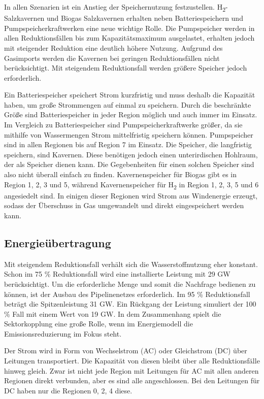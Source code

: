 In allen Szenarien ist ein Anstieg der Speichernutzung festzustellen. H\textsubscript{2}-Salzkavernen und Biogas Salzkavernen erhalten neben Batteriespeichern und Pumpspeicherkraftwerken eine neue wichtige Rolle. Die Pumpspeicher werden in allen Reduktionsfällen bis zum Kapazitätsmaximum ausgelastet, erhalten jedoch mit steigender Reduktion eine deutlich höhere Nutzung. 
Aufgrund des Gasimports werden die Kavernen bei geringen Reduktionsfällen nicht berücksichtigt. Mit steigendem Reduktionsfall werden größere Speicher jedoch erforderlich.


Ein Batteriespeicher speichert Strom kurzfristig und muss deshalb die Kapazität haben, um große Strommengen auf einmal zu speichern. Durch die beschränkte Größe sind Batteriespeicher in jeder Region möglich und auch immer im Einsatz.
Im Vergleich zu Batteriespeicher sind Pumpspeicherkraftwerke größer, da sie mithilfe von Wassermengen Strom mittelfristig speichern können. Pumpspeicher sind in allen Regionen bis auf Region 7 im Einsatz.
Die Speicher, die langfristig speichern, sind Kavernen. Diese benötigen jedoch einen unterirdischen Hohlraum, der als Speicher dienen kann. Die Gegebenheiten für einen solchen Speicher sind also nicht überall einfach zu finden. Kavernenspeicher für Biogas gibt es in Region 1, 2, 3 und 5, während Kavernenspeicher für H\textsubscript{2} in Region 1, 2, 3, 5 und 6 angesiedelt sind. In einigen dieser Regionen wird Strom aus Windenergie erzeugt, sodass der Überschuss in Gas umgewandelt und direkt eingespeichert werden kann.


\subsection{Energieübertragung}
Mit steigendem Reduktionsfall verhält sich die Wasserstoffnutzung eher konstant. Schon im 75 \% Reduktionsfall wird eine installierte Leistung mit 29 GW berücksichtigt. Um die erforderliche Menge und somit die Nachfrage bedienen zu können, ist der Ausbau des Pipelinenetzes erforderlich. Im 95 \% Reduktionsfall beträgt die Spitzenleistung 31 GW. Ein Rückgang der Leistung simuliert der 100 \% Fall mit einem Wert von 19 GW. In dem Zusammenhang spielt die Sektorkopplung eine große Rolle, wenn im Energiemodell die Emissionsreduzierung im Fokus steht. 

Der Strom wird in Form von Wechselstrom (AC) oder Gleichstrom (DC) über Leitungen transportiert. Die Kapazität von diesen bleibt über alle Reduktionsfälle hinweg gleich. Zwar ist nicht jede Region mit Leitungen für AC mit allen anderen Regionen direkt verbunden, aber es sind alle angeschlossen. Bei den Leitungen für DC haben nur die Regionen 0, 2, 4 diese.

